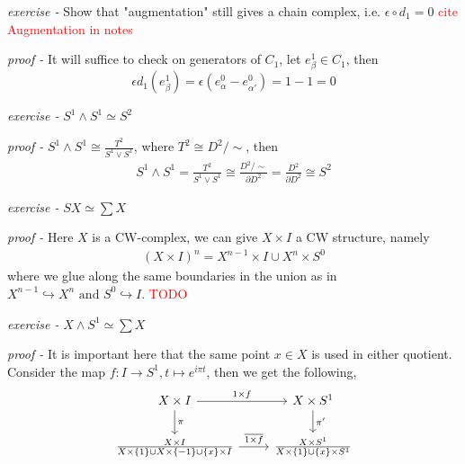 \documentclass[11pt]{article}
\theoremstyle{definition}
\newcommand{\set}[1]{\{#1\}}
\newcommand{\tand}{\text{ and }}
\begin{document}
    \emph{exercise - }\label{HEx6} Show that "augmentation" still gives a chain complex, i.e. \(\epsilon\circ d_1 = 0\) \textcolor{red}{cite Augmentation in notes}

    \emph{proof - } It will suffice to check on generators of \(C_1\), let \(e^1_\beta \in C_1\), then 
    \[\epsilon d_1(e^1_\beta) = \epsilon (e_\alpha^0 - e_{\alpha'}^0) = 1-1 = 0\]


    \emph{exercise - }\label{HEx7} \(S^1 \wedge S^1 \simeq S^2\)

    \emph{proof - } \(S^1 \wedge S^1 \cong \frac{T^2}{S^1 \vee S^1}\), where \(T^2 \cong D^2/\sim\), then
    \begin{align*}
        S^1 \wedge S^1 = \frac{T^2}{S^1 \vee S^1} \cong \frac{D^2/\sim}{\partial D^2} = \frac{D^2}{\partial D^2} \cong S^2
    \end{align*}


    \emph{exercise - }\label{HEx8} \(SX \simeq \sum X\)

    \emph{proof - } Here \(X\) is a CW-complex, we can give \(X \times I\) a CW structure, namely
    \begin{align*}
        (X \times I)^n = X^{n-1} \times I \cup X^n \times S^0
    \end{align*}
    where we glue along the same boundaries in the union as in \(X^{n-1} \hookrightarrow X^n \tand S^0 \hookrightarrow I\). \textcolor{red}{TODO}


    \emph{exercise - }\label{HEx9} \(X \wedge S^1 \simeq \sum X\)

    \emph{proof - } It is important here that the same point \(x \in X\) is used in either quotient. Consider the map \(f: I \to S^1, t \mapsto e^{i\pi t}\), then we get the following,
    \begin{equation*}
        \begin{tikzcd}
            X \times I \arrow[d,"{\pi}"] \arrow[r,"{1 \times f}"] & X \times S^1 \arrow[d,"{\pi'}"] \\
            \frac{X \times I}{X \times \set{1} \cup X \times \set{-1} \cup \set{x}\times I} \arrow[r,"{\overline{1 \times f}}"] &\frac{X \times S^1}{X\times \set{1} \cup \set{x} \times S^1}
        \end{tikzcd}
    \end{equation*}
\end{document}
